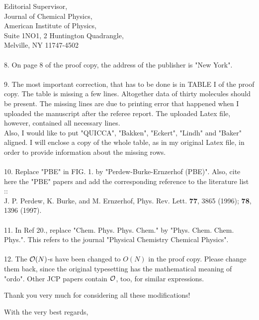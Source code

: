 \begin{letter}{
Editorial Supervisor, \\
Journal of Chemical Physics, \\
American Institute of Physics, \\
Suite 1NO1, 2 Huntington Quadrangle, \\
Melville, NY 11747-4502 }
\\ \\
8. On page 8 of the proof copy, the address of the publisher is "New York".
\\ \\
9. The most important correction, that has to be done 
is in TABLE I of the proof copy. The table is missing a few lines.
Altogether data of thirty molecules should be present. The missing lines are
due to printing error that happened when I uploaded the manuscript 
after the referee report. The uploaded Latex file, however, contained
all necessary lines.\\
Also, I would like to put "QUICCA", "Bakken", "Eckert", "Lindh" and 
"Baker" aligned. I will enclose a copy of the whole table, as in my
original Latex file, in order to provide information about the missing 
rows.
\\ \\ 
10. Replace "PBE" in FIG. 1. by "Perdew-Burke-Ernzerhof (PBE)".
Also, cite here the "PBE" papers and add the corresponding reference
to the literature list :: \\
J. P. Perdew, K. Burke, and M. Ernzerhof, Phys. Rev. Lett. {\bf 77},
3865 (1996); {\bf 78}, 1396 (1997).
\\ \\
11. In Ref 20., replace "Chem. Phys. Phys. Chem." by
"Phys. Chem. Chem. Phys.". This refers to the journal "Physical 
Chemistry Chemical Physics".
\\ \\
12. The ${\cal{O}}(N)$-s have been changed to $O(N)$ in the proof copy.
Please change them back, since the original typesetting has
the mathematical meaning of "ordo". Other JCP papers contain 
${\cal{O}}$, too, for similar expressions.



Thank you very much for considering all these modifications!


\closing{With the very best regards,}
\end{letter}


